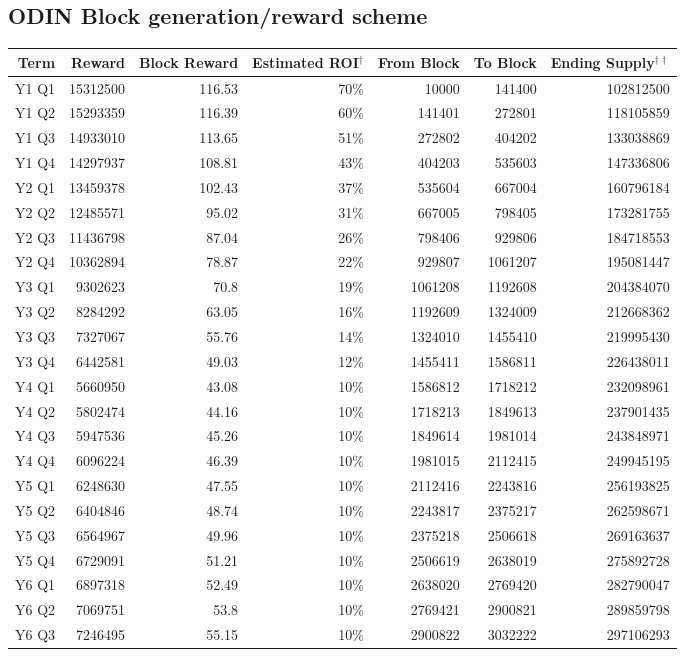 \subsection{ODIN Block generation/reward scheme}
\renewcommand{\arraystretch}{1.2}
\begin{center}
\begin{adjustbox}{max width=\textwidth}
\begin{threeparttable}
\begin{tabular}{|rrrrrrr|}
\hline 
Term & Reward & Block Reward & Estimated ROI$^\dag$ & From Block & To Block & Ending Supply$^{\dag\dag}$\tabularnewline
\hline 
\hline
Y1 Q1 & 15312500 & 116.53 & 70\% & 10000 & 141400 & 102812500\tabularnewline
\hline
Y1 Q2 & 15293359 & 116.39 & 60\% & 141401 & 272801 & 118105859\tabularnewline
\hline
Y1 Q3 & 14933010 & 113.65 & 51\% & 272802 & 404202 & 133038869\tabularnewline
\hline
Y1 Q4 & 14297937 & 108.81 & 43\% & 404203 & 535603 & 147336806\tabularnewline
\hline
Y2 Q1 & 13459378 & 102.43 & 37\% & 535604 & 667004 & 160796184\tabularnewline
\hline
Y2 Q2 & 12485571 & 95.02 & 31\% & 667005 & 798405 & 173281755\tabularnewline
\hline
Y2 Q3 & 11436798 & 87.04 & 26\% & 798406 & 929806 & 184718553\tabularnewline
\hline
Y2 Q4 & 10362894 & 78.87 & 22\% & 929807 & 1061207 & 195081447\tabularnewline
\hline
Y3 Q1 & 9302623 & 70.8 & 19\% & 1061208 & 1192608 & 204384070\tabularnewline
\hline
Y3 Q2 & 8284292 & 63.05 & 16\% & 1192609 & 1324009 & 212668362\tabularnewline
\hline
Y3 Q3 & 7327067 & 55.76 & 14\% & 1324010 & 1455410 & 219995430\tabularnewline
\hline
Y3 Q4 & 6442581 & 49.03 & 12\% & 1455411 & 1586811 & 226438011\tabularnewline
\hline
Y4 Q1 & 5660950 & 43.08 & 10\% & 1586812 & 1718212 & 232098961\tabularnewline
\hline
Y4 Q2 & 5802474 & 44.16 & 10\% & 1718213 & 1849613 & 237901435\tabularnewline
\hline
Y4 Q3 & 5947536 & 45.26 & 10\% & 1849614 & 1981014 & 243848971\tabularnewline
\hline
Y4 Q4 & 6096224 & 46.39 & 10\% & 1981015 & 2112415 & 249945195\tabularnewline
\hline
Y5 Q1 & 6248630 & 47.55 & 10\% & 2112416 & 2243816 & 256193825\tabularnewline
\hline
Y5 Q2 & 6404846 & 48.74 & 10\% & 2243817 & 2375217 & 262598671\tabularnewline
\hline
Y5 Q3 & 6564967 & 49.96 & 10\% & 2375218 & 2506618 & 269163637\tabularnewline
\hline
Y5 Q4 & 6729091 & 51.21 & 10\% & 2506619 & 2638019 & 275892728\tabularnewline
\hline
Y6 Q1 & 6897318 & 52.49 & 10\% & 2638020 & 2769420 & 282790047\tabularnewline
\hline
Y6 Q2 & 7069751 & 53.8 & 10\% & 2769421 & 2900821 & 289859798\tabularnewline
\hline
Y6 Q3 & 7246495 & 55.15 & 10\% & 2900822 & 3032222 & 297106293\tabularnewline
\hline

\end{tabular}
\end{threeparttable}
\end{adjustbox}
\end{center}
